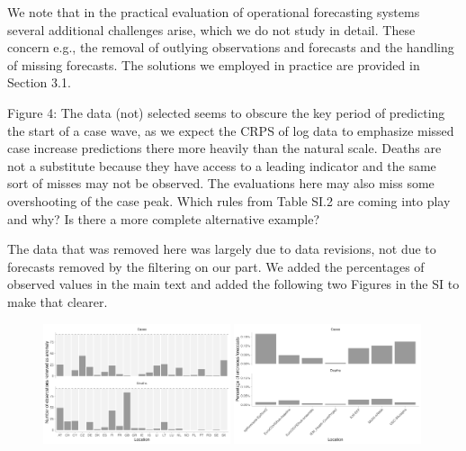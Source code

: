 \documentclass{article}
\newcommand{\black}{\color{black}}
\newcommand{\blue}{\color{blue}}
\newcommand{\indented}{\setlength{\leftskip}{1cm}}
\newcommand{\notindented}{\setlength{\leftskip}{0cm}}
\begin{document}
\indented
We note that in the practical evaluation of operational forecasting systems  several additional challenges arise, which we do not study in detail. These concern e.g., the removal of outlying observations and forecasts and the handling of missing forecasts. The solutions we employed in practice are provided in Section 3.1.

\notindented



\blue
Figure 4: The data (not) selected seems to obscure the key period of predicting the start of a case wave, as we expect the CRPS of log data to emphasize missed case increase predictions there more heavily than the natural scale. Deaths are not a substitute because they have access to a leading indicator and the same sort of misses may not be observed. The evaluations here may also miss some overshooting of the case peak. Which rules from Table SI.2 are coming into play and why? Is there a more complete alternative example?

\black
The data that was removed here was largely due to data revisions, not due to forecasts removed by the filtering on our part. 
We added the percentages of observed values in the main text and added the following two Figures in the SI to make that clearer. 

\begin{figure}[h!]
    \centering
    \includegraphics[width=0.49\textwidth]{../output/figures/number-anomalies.png}
     \includegraphics[width=0.49\textwidth]{../output/figures/erroneous-forecasts.png}
     \caption{}
    \label{fig:number-anomalies}
\end{figure}
\end{document}
